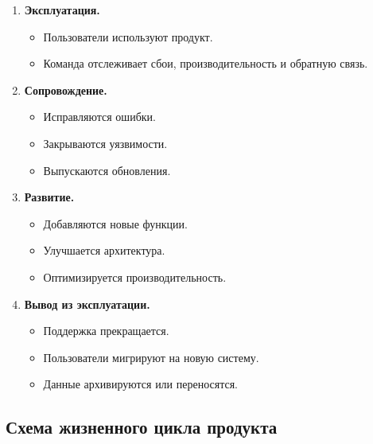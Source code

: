 \documentclass[12pt,a4paper]{article}
\begin{document}
\begin{enumerate}
    \item \textbf{Эксплуатация.}
    \begin{itemize}
        \item Пользователи используют продукт.
        \item Команда отслеживает сбои, производительность и обратную связь.
    \end{itemize}

    \item \textbf{Сопровождение.}
    \begin{itemize}
        \item Исправляются ошибки.
        \item Закрываются уязвимости.
        \item Выпускаются обновления.
    \end{itemize}

    \item \textbf{Развитие.}
    \begin{itemize}
        \item Добавляются новые функции.
        \item Улучшается архитектура.
        \item Оптимизируется производительность.
    \end{itemize}

    \item \textbf{Вывод из эксплуатации.}
    \begin{itemize}
        \item Поддержка прекращается.
        \item Пользователи мигрируют на новую систему.
        \item Данные архивируются или переносятся.
    \end{itemize}
\end{enumerate}

\subsection{Схема жизненного цикла продукта}
\end{document}
